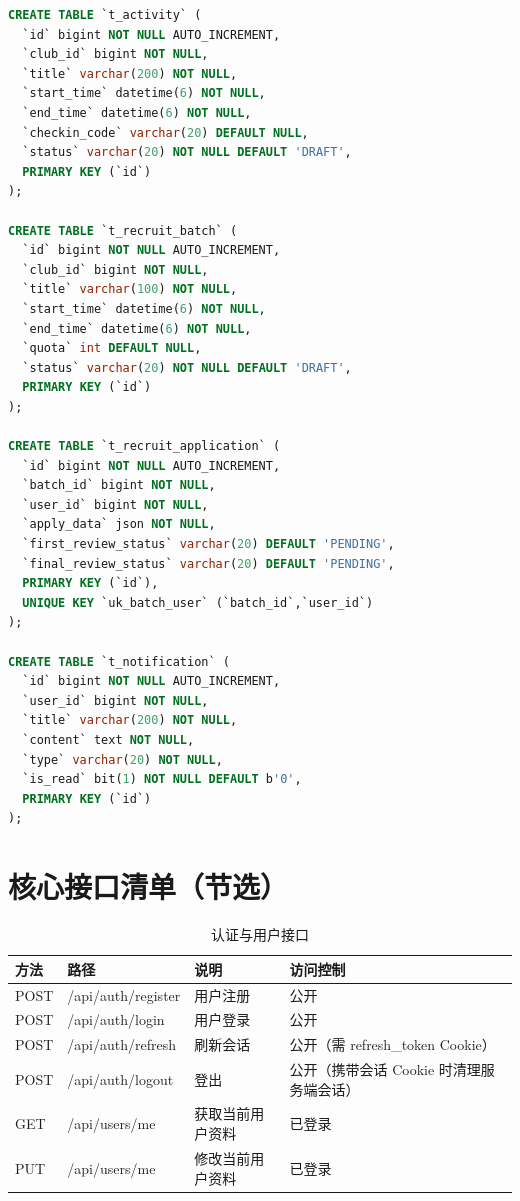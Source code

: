 \begin{lstlisting}[language=SQL, caption=活动、招新、通知相关表]
CREATE TABLE `t_activity` (
  `id` bigint NOT NULL AUTO_INCREMENT,
  `club_id` bigint NOT NULL,
  `title` varchar(200) NOT NULL,
  `start_time` datetime(6) NOT NULL,
  `end_time` datetime(6) NOT NULL,
  `checkin_code` varchar(20) DEFAULT NULL,
  `status` varchar(20) NOT NULL DEFAULT 'DRAFT',
  PRIMARY KEY (`id`)
);

CREATE TABLE `t_recruit_batch` (
  `id` bigint NOT NULL AUTO_INCREMENT,
  `club_id` bigint NOT NULL,
  `title` varchar(100) NOT NULL,
  `start_time` datetime(6) NOT NULL,
  `end_time` datetime(6) NOT NULL,
  `quota` int DEFAULT NULL,
  `status` varchar(20) NOT NULL DEFAULT 'DRAFT',
  PRIMARY KEY (`id`)
);

CREATE TABLE `t_recruit_application` (
  `id` bigint NOT NULL AUTO_INCREMENT,
  `batch_id` bigint NOT NULL,
  `user_id` bigint NOT NULL,
  `apply_data` json NOT NULL,
  `first_review_status` varchar(20) DEFAULT 'PENDING',
  `final_review_status` varchar(20) DEFAULT 'PENDING',
  PRIMARY KEY (`id`),
  UNIQUE KEY `uk_batch_user` (`batch_id`,`user_id`)
);

CREATE TABLE `t_notification` (
  `id` bigint NOT NULL AUTO_INCREMENT,
  `user_id` bigint NOT NULL,
  `title` varchar(200) NOT NULL,
  `content` text NOT NULL,
  `type` varchar(20) NOT NULL,
  `is_read` bit(1) NOT NULL DEFAULT b'0',
  PRIMARY KEY (`id`)
);
\end{lstlisting}

\chapter{核心接口清单（节选）}

\begin{table}[H]
\centering
\caption{认证与用户接口}
\begin{tabular}{llll}
\toprule
方法 & 路径 & 说明 & 访问控制 \\
\midrule
POST & /api/auth/register & 用户注册 & 公开 \\
POST & /api/auth/login & 用户登录 & 公开 \\
POST & /api/auth/refresh & 刷新会话 & 公开（需 refresh\_token Cookie） \\
POST & /api/auth/logout & 登出 & 公开（携带会话 Cookie 时清理服务端会话） \\
GET & /api/users/me & 获取当前用户资料 & 已登录 \\
PUT & /api/users/me & 修改当前用户资料 & 已登录 \\
\bottomrule
\end{tabular}
\end{table}

